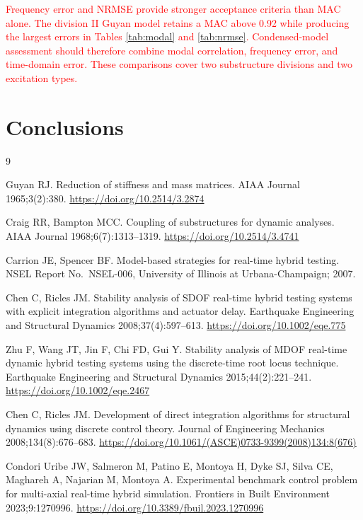 \documentclass[11pt,a4paper]{article}
\numberwithin{equation}{section}
\newcommand{\rev}[1]{\textcolor{red}{#1}}
\begin{document}
\rev{Frequency error and NRMSE provide stronger acceptance criteria than MAC alone. The division II Guyan model retains a MAC above 0.92 while producing the largest errors in Tables \ref{tab:modal} and \ref{tab:nrmse}. Condensed-model assessment should therefore combine modal correlation, frequency error, and time-domain error. These comparisons cover two substructure divisions and two excitation types.}




\section{Conclusions} \label{sec6}



\begin{thebibliography}{9}
	
	Guyan RJ. Reduction of stiffness and mass matrices. AIAA Journal 1965;3(2):380. \url{https://doi.org/10.2514/3.2874}
	
	Craig RR, Bampton MCC. Coupling of substructures for dynamic analyses. AIAA Journal 1968;6(7):1313--1319. \url{https://doi.org/10.2514/3.4741}
	
	Carrion JE, Spencer BF. Model-based strategies for real-time hybrid testing. NSEL Report No.\ NSEL-006, University of Illinois at Urbana-Champaign; 2007.
	
	Chen C, Ricles JM. Stability analysis of SDOF real-time hybrid testing systems with explicit integration algorithms and actuator delay. Earthquake Engineering and Structural Dynamics 2008;37(4):597--613. \url{https://doi.org/10.1002/eqe.775}
	
	Zhu F, Wang JT, Jin F, Chi FD, Gui Y. Stability analysis of MDOF real-time dynamic hybrid testing systems using the discrete-time root locus technique. Earthquake Engineering and Structural Dynamics 2015;44(2):221--241. \url{https://doi.org/10.1002/eqe.2467}
	
	Chen C, Ricles JM. Development of direct integration algorithms for structural dynamics using discrete control theory. Journal of Engineering Mechanics 2008;134(8):676--683. \url{https://doi.org/10.1061/(ASCE)0733-9399(2008)134:8(676)}
	
	Condori Uribe JW, Salmeron M, Patino E, Montoya H, Dyke SJ, Silva CE, Maghareh A, Najarian M, Montoya A. Experimental benchmark control problem for multi-axial real-time hybrid simulation. Frontiers in Built Environment 2023;9:1270996. \url{https://doi.org/10.3389/fbuil.2023.1270996}
	

\end{thebibliography}
\end{document}
